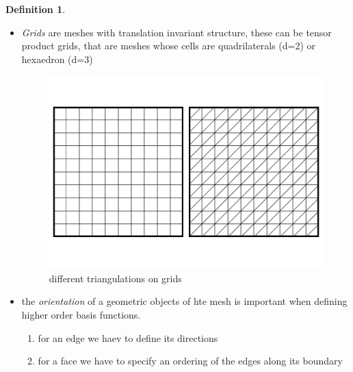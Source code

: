 \documentclass[english]{article}
\theoremstyle{definition}
\newtheorem*{defi}{Definition}
\theoremstyle{remark}
\begin{document}
\begin{defi}
\begin{itemize}
  \item \emph{Grids} are meshes with translation invariant structure, these can be tensor product grids, that are meshes whose cells are quadrilaterals (d=2) or hexaedron (d=3)
    \begin{figure}[H]
      \begin{center}
        \includegraphics[width=\textwidth]{figs/grids.pdf}
      \end{center}
      \caption{different triangulations on grids}
      \label{grids-figure}
    \end{figure}
  \item the \emph{orientation} of a geometric objects of hte mesh is important when defining higher order basis functions.
    \begin{enumerate}
    \item for an edge we haev to define its directions
    \item for a face we have to specify an ordering of the edges along its boundary
      
    \end{enumerate}

  \end{itemize}
\end{defi}
\end{document}
